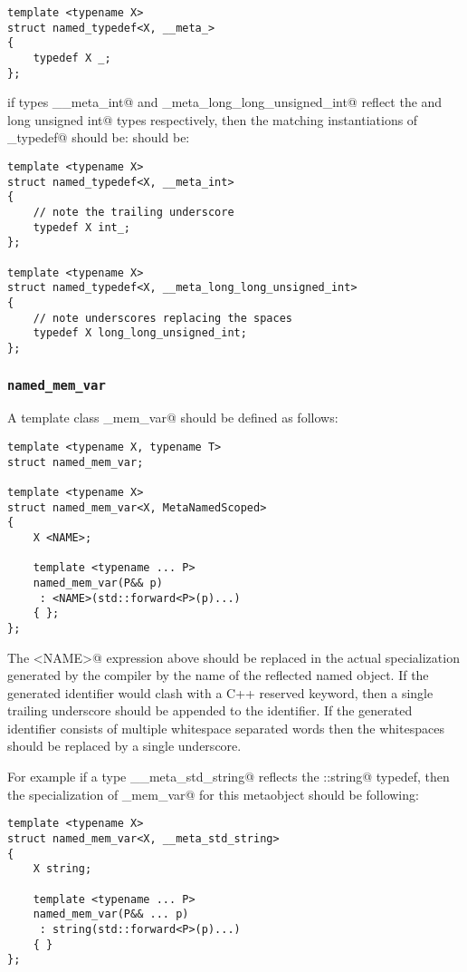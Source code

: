 \begin{verbatim}
template <typename X>
struct named_typedef<X, __meta_>
{
	typedef X _;
};
\end{verbatim}

if types \verb@__meta_int@ and \verb@_meta_long_long_unsigned_int@ reflect the \verb@int@ and \verb@long long unsigned int@
types respectively, then the matching instantiations of \verb@named_typedef@ should be:
should be:

\begin{verbatim}
template <typename X>
struct named_typedef<X, __meta_int>
{
	// note the trailing underscore
	typedef X int_;
};

template <typename X>
struct named_typedef<X, __meta_long_long_unsigned_int>
{
	// note underscores replacing the spaces
	typedef X long_long_unsigned_int;
};
\end{verbatim}

\subsubsection{\texttt{named\_mem\_var}}

A template class \verb@named_mem_var@ should be defined as follows:

\begin{verbatim}
template <typename X, typename T>
struct named_mem_var;

template <typename X>
struct named_mem_var<X, MetaNamedScoped>
{
	X <NAME>;

	template <typename ... P>
	named_mem_var(P&& p)
	 : <NAME>(std::forward<P>(p)...)
	{ };
};
\end{verbatim}

The \verb@<NAME>@ expression above should be replaced in the actual specialization generated by the compiler
by the name of the reflected named object. If the generated identifier would clash with a C++
reserved keyword, then a single trailing underscore should be appended to the identifier.
If the generated identifier consists of multiple whitespace separated words then the whitespaces
should be replaced by a single underscore.

For example if a type \verb@__meta_std_string@
reflects the \verb@std::string@ typedef, then the specialization of \verb@named_mem_var@
for this metaobject should be following:

\begin{verbatim}
template <typename X>
struct named_mem_var<X, __meta_std_string>
{
	X string;

	template <typename ... P>
	named_mem_var(P&& ... p)
	 : string(std::forward<P>(p)...)
	{ }
};
\end{verbatim}

